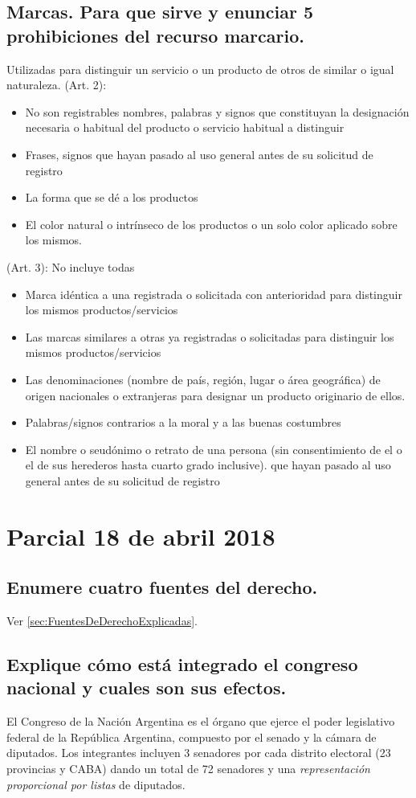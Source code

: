 \documentclass{article}
\begin{document}
\subsection{Marcas. Para que sirve y enunciar 5 prohibiciones del recurso marcario.}
\label{sec:ParaQueSirvenMarcasYProhibiciones}
Utilizadas para distinguir un servicio o un producto de otros de similar o igual naturaleza.
(Art. 2):
\begin{itemize}
\item No son registrables nombres, palabras y signos que constituyan la designación necesaria o habitual del producto o servicio habitual a distinguir
\item Frases, signos que hayan pasado al uso general antes de su solicitud de registro
\item La forma que se dé a los  productos
\item El color natural o intrínseco de los productos o un solo color aplicado sobre los mismos.
\end{itemize}
(Art. 3):  No incluye todas
\begin{itemize}
\item Marca idéntica a una registrada o solicitada con anterioridad para distinguir los mismos productos/servicios
\item Las marcas similares a otras ya registradas o solicitadas para distinguir los mismos productos/servicios
\item Las denominaciones (nombre de país, región, lugar o área geográfica) de origen nacionales o extranjeras para designar un producto originario de ellos.
\item Palabras/signos contrarios a la moral y a las buenas costumbres
\item El nombre o seudónimo o retrato de una persona (sin consentimiento de el o el de sus herederos hasta cuarto grado inclusive). que hayan pasado al uso general antes de su solicitud de registro
\end{itemize}


\section{Parcial 18 de abril 2018}
\subsection{Enumere cuatro fuentes del derecho. }
Ver \ref{sec:FuentesDeDerechoExplicadas}.

\subsection{Explique cómo está integrado el congreso nacional y cuales son sus efectos.}
El Congreso de la Nación Argentina es el órgano que ejerce el poder legislativo federal de la República Argentina, compuesto por el senado y la cámara de diputados.  Los integrantes incluyen 3 senadores por cada distrito electoral (23 provincias y CABA) dando un total de 72 senadores y una \textit{representación proporcional por listas} de diputados. 
\end{document}
